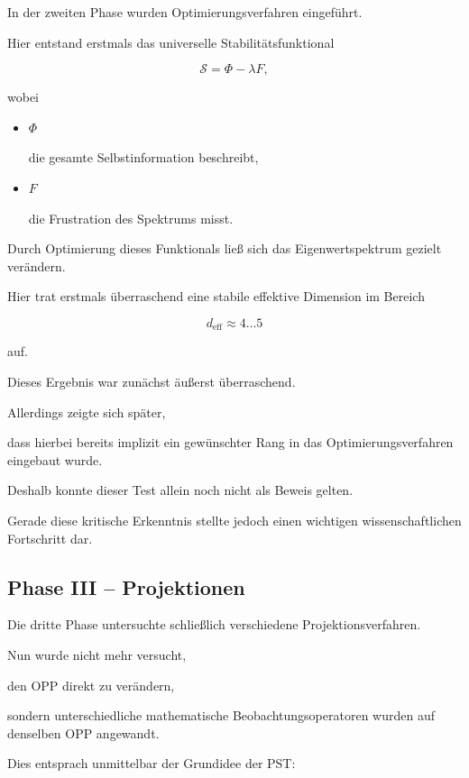 In der zweiten Phase wurden Optimierungsverfahren eingeführt.

Hier entstand erstmals das universelle Stabilitätsfunktional

\[
\mathcal{S}
=
\Phi
-
\lambda F,
\]

wobei

\begin{itemize}

\item
\(
\Phi
\)

die gesamte Selbstinformation beschreibt,

\item

\(
F
\)

die Frustration des Spektrums misst.

\end{itemize}

Durch Optimierung dieses Funktionals ließ sich das Eigenwertspektrum gezielt verändern.

Hier trat erstmals überraschend eine stabile effektive Dimension im Bereich

\[
d_{\mathrm{eff}}
\approx
4\ldots5
\]

auf.

Dieses Ergebnis war zunächst äußerst überraschend.

Allerdings zeigte sich später,

dass hierbei bereits implizit ein gewünschter Rang in das Optimierungsverfahren eingebaut wurde.

Deshalb konnte dieser Test allein noch nicht als Beweis gelten.

Gerade diese kritische Erkenntnis stellte jedoch einen wichtigen wissenschaftlichen Fortschritt dar.


\subsection*{Phase III – Projektionen}

Die dritte Phase untersuchte schließlich verschiedene Projektionsverfahren.

Nun wurde nicht mehr versucht,

den OPP direkt zu verändern,

sondern unterschiedliche mathematische Beobachtungsoperatoren wurden auf denselben OPP angewandt.

Dies entsprach unmittelbar der Grundidee der PST:

